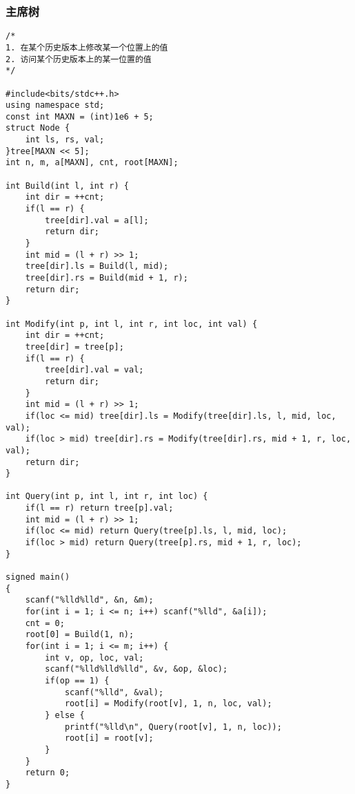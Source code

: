 \subsubsection{主席树}
\begin{lstlisting}
/*
1. 在某个历史版本上修改某一个位置上的值
2. 访问某个历史版本上的某一位置的值 
*/

#include<bits/stdc++.h>
using namespace std;
const int MAXN = (int)1e6 + 5;
struct Node {
	int ls, rs, val;
}tree[MAXN << 5];
int n, m, a[MAXN], cnt, root[MAXN];

int Build(int l, int r) {
	int dir = ++cnt;
	if(l == r) {
		tree[dir].val = a[l];
		return dir;
	}
	int mid = (l + r) >> 1; 
	tree[dir].ls = Build(l, mid);
	tree[dir].rs = Build(mid + 1, r);
	return dir;
}

int Modify(int p, int l, int r, int loc, int val) {
	int dir = ++cnt;
	tree[dir] = tree[p];
	if(l == r) {
		tree[dir].val = val;
		return dir;
	}
	int mid = (l + r) >> 1;
	if(loc <= mid) tree[dir].ls = Modify(tree[dir].ls, l, mid, loc, val);
	if(loc > mid) tree[dir].rs = Modify(tree[dir].rs, mid + 1, r, loc, val); 
	return dir;
}

int Query(int p, int l, int r, int loc) {
	if(l == r) return tree[p].val;
	int mid = (l + r) >> 1;
	if(loc <= mid) return Query(tree[p].ls, l, mid, loc);
	if(loc > mid) return Query(tree[p].rs, mid + 1, r, loc);
}

signed main()
{
	scanf("%lld%lld", &n, &m);
	for(int i = 1; i <= n; i++) scanf("%lld", &a[i]);
	cnt = 0;
	root[0] = Build(1, n);
	for(int i = 1; i <= m; i++) {
		int v, op, loc, val;
		scanf("%lld%lld%lld", &v, &op, &loc);
		if(op == 1) {
			scanf("%lld", &val);
			root[i] = Modify(root[v], 1, n, loc, val);
		} else {
			printf("%lld\n", Query(root[v], 1, n, loc));
			root[i] = root[v];
		}
	}
	return 0;
}
\end{lstlisting}
